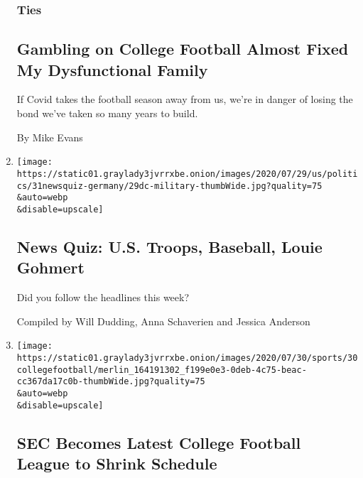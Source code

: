 \begin{enumerate}
  \hypertarget{ties}{%
  \subsubsection{Ties}\label{ties}}

  \hypertarget{gambling-on-college-football-almost-fixed-my-dysfunctional-family}{%
  \subsection{Gambling on College Football Almost Fixed My Dysfunctional
  Family}\label{gambling-on-college-football-almost-fixed-my-dysfunctional-family}}

  If Covid takes the football season away from us, we're in danger of
  losing the bond we've taken so many years to build.

  By Mike Evans
\item
  \href{/interactive/2020/07/31/briefing/troops-baseball-louie-gohmert-news-quiz.html}{}

  \texttt{[image: https://static01.graylady3jvrrxbe.onion/images/2020/07/29/us/politics/31newsquiz-germany/29dc-military-thumbWide.jpg?quality=75\\\&auto=webp\\\&disable=upscale]}

  \hypertarget{news-quiz-us-troops-baseball-louie-gohmert}{%
  \subsection{News Quiz: U.S. Troops, Baseball, Louie
  Gohmert}\label{news-quiz-us-troops-baseball-louie-gohmert}}

  Did you follow the headlines this week?

  Compiled by Will Dudding, Anna Schaverien and Jessica Anderson
\item
  \href{/2020/07/30/sports/coronavirus-sec-schedule.html}{}

  \texttt{[image: https://static01.graylady3jvrrxbe.onion/images/2020/07/30/sports/30collegefootball/merlin\_164191302\_f199e0e3-0deb-4c75-beac-cc367da17c0b-thumbWide.jpg?quality=75\\\&auto=webp\\\&disable=upscale]}

  \hypertarget{sec-becomes-latest-college-football-league-to-shrink-schedule}{%
  \subsection{SEC Becomes Latest College Football League to Shrink
  Schedule}\label{sec-becomes-latest-college-football-league-to-shrink-schedule}}


\end{enumerate}
